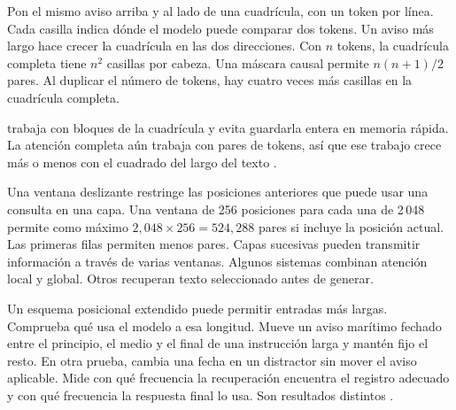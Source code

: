{Pon el mismo aviso arriba y al lado de una cuadrícula, con un token por línea. Cada casilla indica dónde el modelo puede comparar dos tokens. Un aviso más largo hace crecer la cuadrícula en las dos direcciones. Con \(n\) tokens, la cuadrícula completa tiene \(n^2\) casillas por cabeza. Una máscara causal permite \(n(n+1)/2\) pares. Al duplicar el número de tokens, hay cuatro veces más casillas en la cuadrícula completa.

 trabaja con bloques de la cuadrícula y evita guardarla entera en memoria rápida. La atención completa aún trabaja con pares de tokens, así que ese trabajo crece más o menos con el cuadrado del largo del texto \citep{flash}.}

{Una ventana deslizante restringe las posiciones anteriores que puede usar una consulta en una capa. Una ventana de 256 posiciones para cada una de 2\,048 permite como máximo \(2{,}048\times256=524{,}288\) pares si incluye la posición actual. Las primeras filas permiten menos pares. Capas sucesivas pueden transmitir información a través de varias ventanas. Algunos sistemas combinan atención local y global. Otros recuperan texto seleccionado antes de generar.}

{Un esquema posicional extendido puede permitir entradas más largas. Comprueba qué usa el modelo a esa longitud. Mueve un aviso marítimo fechado entre el principio, el medio y el final de una instrucción larga y mantén fijo el resto. En otra prueba, cambia una fecha en un distractor sin mover el aviso aplicable. Mide con qué frecuencia la recuperación encuentra el registro adecuado y con qué frecuencia la respuesta final lo usa. Son resultados distintos \citep{lostmiddle}.}

